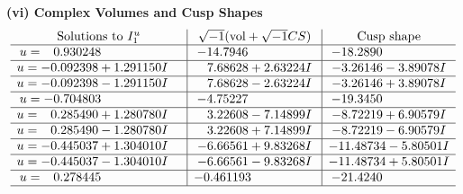 \documentclass[1p]{elsarticle_modified}
\theoremstyle{definition}
\newcommand{\I}{\sqrt{-1}}
\begin{document}
\newpage\flushleft \textbf{(vi) Complex Volumes and Cusp Shapes}
$$\begin{array}{c|c|c}  
\text{Solutions to }I^u_{1}& \I (\text{vol} + \sqrt{-1}CS) & \text{Cusp shape}\\
 \hline 
\begin{aligned}
u &= \phantom{-}0.930248\phantom{ +0.000000I}\end{aligned}
 & -14.7946\phantom{ +0.000000I} & -18.2890\phantom{ +0.000000I} \\ \hline\begin{aligned}
u &= -0.092398 + 1.291150 I\end{aligned}
 & \phantom{-}7.68628 + 2.63224 I & -3.26146 - 3.89078 I \\ \hline\begin{aligned}
u &= -0.092398 - 1.291150 I\end{aligned}
 & \phantom{-}7.68628 - 2.63224 I & -3.26146 + 3.89078 I \\ \hline\begin{aligned}
u &= -0.704803\phantom{ +0.000000I}\end{aligned}
 & -4.75227\phantom{ +0.000000I} & -19.3450\phantom{ +0.000000I} \\ \hline\begin{aligned}
u &= \phantom{-}0.285490 + 1.280780 I\end{aligned}
 & \phantom{-}3.22608 - 7.14899 I & -8.72219 + 6.90579 I \\ \hline\begin{aligned}
u &= \phantom{-}0.285490 - 1.280780 I\end{aligned}
 & \phantom{-}3.22608 + 7.14899 I & -8.72219 - 6.90579 I \\ \hline\begin{aligned}
u &= -0.445037 + 1.304010 I\end{aligned}
 & -6.66561 + 9.83268 I & -11.48734 - 5.80501 I \\ \hline\begin{aligned}
u &= -0.445037 - 1.304010 I\end{aligned}
 & -6.66561 - 9.83268 I & -11.48734 + 5.80501 I \\ \hline\begin{aligned}
u &= \phantom{-}0.278445\phantom{ +0.000000I}\end{aligned}
 & -0.461193\phantom{ +0.000000I} & -21.4240\phantom{ +0.000000I}\\
 \hline 
 \end{array}$$\newpage\newpage\renewcommand{\arraystretch}{1}
\end{document}
